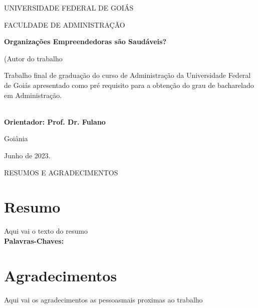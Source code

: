 \documentclass[12pt, a4paper, oneside]{book}
\begin{document}
\begin{titlepage}
\addtolength{\topmargin}{1.5cm} %

\setlength{\baselineskip}{1.4\baselineskip} 

\begin{center}
\large{UNIVERSIDADE FEDERAL DE GOIÁS}

\large{FACULDADE DE ADMINISTRAÇÃO}
\end{center}


\vspace{2cm}

\begin{center}
\Large\textbf{Organizações Empreendedoras são Saudáveis?}
\end{center}

\vspace{1,5cm}
\begin{center}
\large(Autor do trabalho
\end{center}

\vspace{1,5cm}

\begin{flushright}
\begin{minipage}{12cm}
\hrulefill

Trabalho final de graduação do curso de Administração da Universidade Federal de Goiás apresentado como pré requisito para a obtenção do grau de bacharelado em Administração.

\hrulefill\\

\textbf{Orientador: Prof. Dr. Fulano}
\end{minipage}
\end{flushright}

\setlength{\baselineskip}{0.7\baselineskip} 
\vfill %

\begin{center}
Goiânia

Junho de 2023.
\end{center}
\end{titlepage}

\vspace{1,5cm}

RESUMOS E AGRADECIMENTOS

\chapter*{Resumo}

\noindent
Aqui vai o texto do resumo\\
\noindent
\textbf{Palavras-Chaves:}

\chapter*{Agradecimentos}
\noindent
Aqui vai os agradecimentos as pessoasmais proximas ao trabalho
\end{document}
